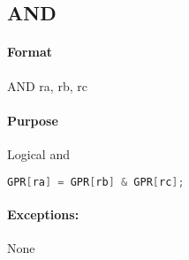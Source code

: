 \subsection{AND}


\paragraph{Format} AND ra, rb, rc

\paragraph{Purpose} Logical and

\begin{lstlisting}[language=c]
    GPR[ra] = GPR[rb] & GPR[rc];
\end{lstlisting}

\paragraph{Exceptions:} None
